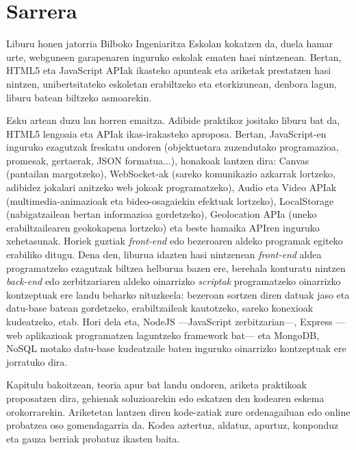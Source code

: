 \chapter*{Sarrera}

Liburu honen jatorria Bilboko Ingeniaritza Eskolan kokatzen da, duela hamar urte, webguneen garapenaren inguruko eskolak ematen hasi nintzenean. Bertan, HTML5 eta JavaScript APIak ikasteko apunteak eta ariketak prestatzen hasi nintzen, unibertsitateko eskoletan erabiltzeko eta etorkizunean, denbora lagun, liburu batean biltzeko asmoarekin. 

Esku artean duzu lan horren emaitza. Adibide praktikoz jositako liburu bat da, HTML5 lengoaia eta APIak ikas-irakasteko aproposa. Bertan, JavaScript-en inguruko ezagutzak freskatu ondoren (objektuetara zuzendutako programazioa, promesak, gertaerak, JSON formatua...), honakoak lantzen dira: Canvas (pantailan margotzeko), WebSocket-ak (sareko komunikazio azkarrak lortzeko, adibidez jokalari anitzeko web jokoak programatzeko), Audio eta Video APIak (multimedia-animazioak eta bideo-osagaiekin efektuak lortzeko), LocalStorage (nabigatzailean bertan informazioa gordetzeko), Geolocation APIa (uneko erabiltzailearen geokokapena lortzeko) eta beste hamaika APIren inguruko xehetasunak. Horiek guztiak \textit{front-end} edo bezeroaren aldeko programak egiteko erabiliko ditugu. Dena den, liburua idazten hasi nintzenean \textit{front-end} aldea programatzeko ezagutzak biltzea helburua bazen ere, berehala konturatu nintzen \textit{back-end} edo zerbitzariaren aldeko oinarrizko \textit{scriptak} programatzeko oinarrizko kontzeptuak ere landu beharko nituzkeela: bezeroan sortzen diren datuak jaso eta datu-base batean gordetzeko, erabiltzaileak kautotzeko, sareko konexioak kudeatzeko, etab. Hori dela eta, NodeJS —JavaScript zerbitzarian—, Express —web aplikazioak programatzen laguntzeko framework bat— eta MongoDB, NoSQL motako datu-base kudeatzaile baten inguruko oinarrizko kontzeptuak ere jorratuko dira.

Kapitulu bakoitzean, teoria apur bat landu ondoren, ariketa praktikoak proposatzen dira, gehienak soluzioarekin edo eskatzen den kodearen eskema orokorrarekin. Ariketetan lantzen diren kode-zatiak zure ordenagailuan edo online probatzea oso gomendagarria da. Kodea aztertuz, aldatuz, apurtuz, konponduz eta gauza berriak probatuz ikasten baita. 

